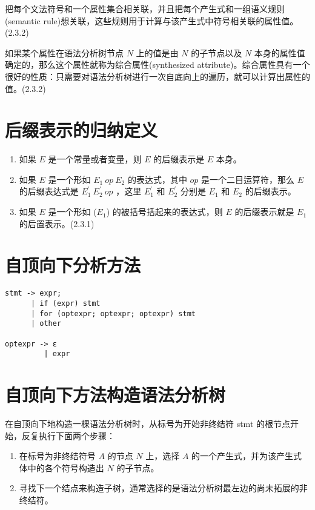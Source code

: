 \documentclass[12pt]{article}
\begin{document}
把每个文法符号和一个属性集合相关联，并且把每个产生式和一组语义规则(semantic rule)想关联，这些规则用于计算与该产生式中符号相关联的属性值。(2.3.2)

如果某个属性在语法分析树节点 $N$ 上的值是由 $N$ 的子节点以及 $N$ 本身的属性值确定的，那么这个属性就称为综合属性(synthesized attribute)。综合属性具有一个很好的性质：只需要对语法分析树进行一次自底向上的遍历，就可以计算出属性的值。(2.3.2)


\section*{后缀表示的归纳定义}

\begin{enumerate}
\item 如果 $E$ 是一个常量或者变量，则 $E$ 的后缀表示是 $E$ 本身。
\item 如果 $E$ 是一个形如 $E_1\ op \ E_2$ 的表达式，其中 $op$ 是一个二目运算符，那么 $E$ 的后缀表达式是 $E_{1}^{'} \ E_{2}^{'} \ op$ ，这里 $E_{1}^{'}$ 和 $E_{2}^{'}$ 分别是 $E_{1}$ 和 $E_{2}$ 的后缀表示。
\item 如果 $E$ 是一个形如 ($E_{1}$) 的被括号括起来的表达式，则 $E$ 的后缀表示就是 $E_{1}$ 的后置表示。(2.3.1)
\end{enumerate}

\pagebreak
\section*{自顶向下分析方法}

\begin{lstlisting}[caption={示例文法}]
stmt -> expr;
      | if (expr) stmt
      | for (optexpr; optexpr; optexpr) stmt
      | other

optexpr -> ε
         | expr 
\end{lstlisting}

\section*{自顶向下方法构造语法分析树}

在自顶向下地构造一棵语法分析树时，从标号为开始非终结符 stmt 的根节点开始，反复执行下面两个步骤：

\begin{enumerate}
\item 在标号为非终结符号 $A$ 的节点 $N$ 上，选择 $A$ 的一个产生式，并为该产生式体中的各个符号构造出 $N$ 的子节点。
\item 寻找下一个结点来构造子树，通常选择的是语法分析树最左边的尚未拓展的非终结符。
\end{enumerate}
\end{document}
